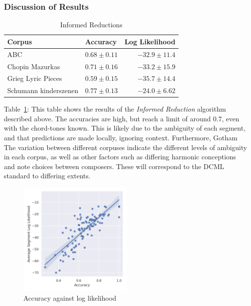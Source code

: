 \documentclass[12pt,a4paper,twoside,openany]{report} \usepackage[pdfborder={0 0 0}]{hyperref}    %
\theoremstyle{definition} \newtheorem{definition}{Definition}[section]
\begin{document}
   
  \subsubsection{Discussion of Results}

  \begin{table}[ht!] 
  \caption{Informed Reductions} 
  \label{tab:informedReductions} \centering
  \begin{tabularx}{0.7\textwidth}{lXr} 
    Corpus & Accuracy & Log Likelihood \\
    \toprule 
    ABC             & $0.68 \pm 0.11$ & $-32.9 \pm 11.4$ \\ 
    Chopin Mazurkas & $0.71 \pm 0.16$ & $-33.2 \pm 15.9$ \\
    Grieg Lyric Pieces & $0.59 \pm 0.15$ & $-35.7 \pm 14.4$ \\
    Schumann kinderszenen & $0.77 \pm 0.13$ &  $-24.0 \pm 6.62$ \\
  \end{tabularx} 
  \end{table}

  Table~\ref{tab:informedReductions}: This table shows the results of the \textit{Informed Reduction} algorithm
  described above. The accuracies are high, but reach a limit of around 0.7, even with the chord-tones known. This is
  likely due to the ambiguity of each segment, and that predictions are made locally, ignoring context. Furthermore,
  Gotham The variation
  between different corpuses indicate the different levels of ambiguity in each corpus, as well as other factors such as
  differing harmonic conceptions and note choices between composers. These will correspond to the DCML standard to differing extents. 

  \begin{figure}[ht]
    \begin{center}
      \includegraphics[width=0.5\textwidth]{figs/eval/perfectAccuracyChordType.png}
    \end{center}
    \caption{Accuracy against log likelihood}
    \label{fig:accvsLik}
  \end{figure}
  
\end{document}
